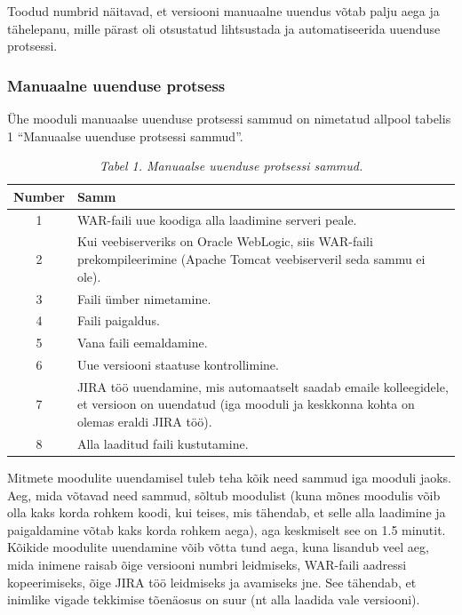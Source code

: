 \documentclass[12pt]{report}
\begin{document}
  Toodud numbrid näitavad, et versiooni manuaalne uuendus võtab palju aega ja tähelepanu, mille pärast oli otsustatud lihtsustada ja automatiseerida uuenduse protsessi.
  
  \newpage
  \subsubsection{Manuaalne uuenduse protsess}
  
  Ühe mooduli manuaalse uuenduse protsessi sammud on nimetatud allpool tabelis 1 ``Manuaalse uuenduse protsessi sammud''.
  
  \begin{table}[H]
    \caption*{\textit{Tabel 1. Manuaalse uuenduse protsessi sammud.}}
  
    \begin{tabular}{ |c|p{11cm}| }
      \hline
      \textbf{Number} & \textbf{Samm}\\
      \hline
      1 & WAR\--faili uue koodiga alla laadimine serveri peale.\\
      \hline
      2 & Kui veebiserveriks on Oracle WebLogic, siis WAR\--faili prekompileerimine (Apache Tomcat veebiserveril seda sammu ei ole).\\
      \hline
      3 & Faili ümber nimetamine.\\
      \hline
      4 & Faili paigaldus.\\
      \hline
      5 & Vana faili eemaldamine.\\
      \hline
      6 & Uue versiooni staatuse kontrollimine.\\
      \hline
      7 & JIRA töö uuendamine, mis automaatselt saadab emaile kolleegidele, et versioon on uuendatud (iga mooduli ja keskkonna kohta on olemas eraldi JIRA töö).\\
      \hline
      8 & Alla laaditud faili kustutamine.\\
      \hline
    \end{tabular}
  \end{table}
  
  Mitmete moodulite uuendamisel tuleb teha kõik need sammud iga mooduli jaoks. Aeg, mida võtavad need sammud, sõltub moodulist (kuna mõnes moodulis võib olla kaks korda rohkem koodi, kui teises, mis tähendab, et selle alla laadimine ja paigaldamine võtab kaks korda rohkem aega), aga keskmiselt see on 1.5 minutit. Kõikide moodulite uuendamine võib võtta tund aega, kuna lisandub veel aeg, mida inimene raisab õige versiooni numbri leidmiseks, WAR\--faili aadressi kopeerimiseks, õige JIRA töö leidmiseks ja avamiseks jne. See tähendab, et inimlike vigade tekkimise tõenäosus on suur (nt alla laadida vale versiooni).\\
  
\end{document}
